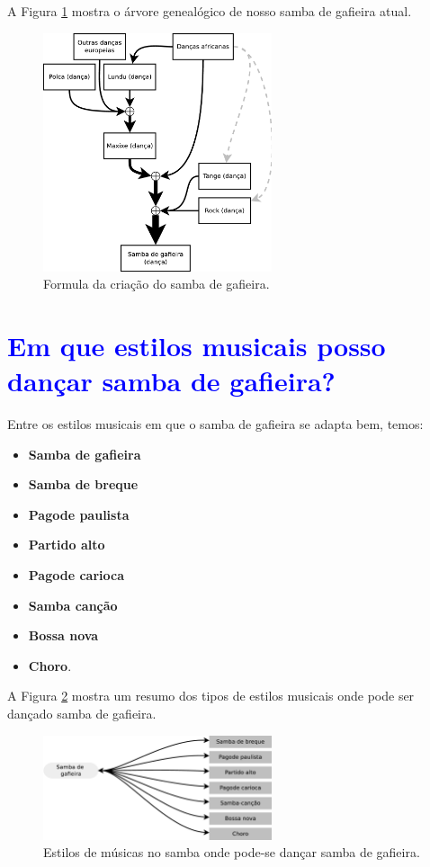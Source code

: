 A Figura \ref{fig:formuladosambagafieira} mostra o árvore genealógico de nosso samba de gafieira atual.
\begin{figure}[h]
  \centering
    \includegraphics[width=0.6\textwidth]{chapters/cap-historia-sambagafieira/sambagafieiraformula.eps}
  \caption{Formula da criação do samba de gafieira.}
\label{fig:formuladosambagafieira}
\end{figure}

\section{\textcolor{blue}{Em que estilos musicais posso dançar samba de gafieira?}}
\label{subsec:gafieiradancaestilos}

Entre os estilos musicais em que o samba de gafieira se adapta bem, temos:
\begin{itemize}
\item \textbf{Samba de gafieira}
\item \textbf{Samba de breque}
\item \textbf{Pagode paulista}
\item \textbf{Partido alto}
\item \textbf{Pagode carioca}
\item \textbf{Samba canção}
\item \textbf{Bossa nova}
\item \textbf{Choro}.
\end{itemize}

A Figura \ref{fig:gafieiradancaestilos} mostra um resumo dos 
tipos de estilos musicais onde pode ser dançado samba de gafieira.
\begin{figure}[h]
  \centering
    \includegraphics[width=0.6\textwidth]{chapters/cap-historia-sambagafieira/gafieiravcmusica.eps}
  \caption{ Estilos de músicas no samba onde pode-se dançar samba de gafieira.}
\label{fig:gafieiradancaestilos}
\end{figure}

